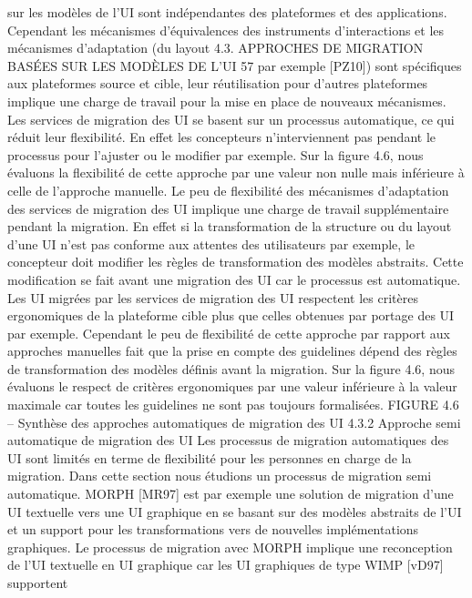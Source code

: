 \documentclass{article}
\begin{document}
sur les mod\`{e}les de l’UI sont ind\'{e}pendantes des plateformes et des applications. Cependant les m\'{e}canismes d’\'{e}quivalences des instruments d’interactions et les m\'{e}canismes d’adaptation (du layout
4.3. APPROCHES DE MIGRATION BASÉES SUR LES MODÈLES DE L’UI
57
par exemple [PZ10]) sont sp\'{e}ciﬁques aux plateformes source et cible, leur r\'{e}utilisation pour d’autres
plateformes implique une charge de travail pour la mise en place de nouveaux m\'{e}canismes.
Les services de migration des UI se basent sur un processus automatique, ce qui r\'{e}duit leur ﬂexibilit\'{e}. En effet les concepteurs n’interviennent pas pendant le processus pour l’ajuster ou le modiﬁer
par exemple. Sur la ﬁgure 4.6, nous \'{e}valuons la ﬂexibilit\'{e} de cette approche par une valeur non nulle
mais inf\'{e}rieure \`{a} celle de l’approche manuelle. Le peu de ﬂexibilit\'{e} des m\'{e}canismes d’adaptation des
services de migration des UI implique une charge de travail suppl\'{e}mentaire pendant la migration. En
effet si la transformation de la structure ou du layout d’une UI n’est pas conforme aux attentes des utilisateurs par exemple, le concepteur doit modiﬁer les r\`{e}gles de transformation des mod\`{e}les abstraits.
Cette modiﬁcation se fait avant une migration des UI car le processus est automatique.
Les UI migr\'{e}es par les services de migration des UI respectent les crit\`{e}res ergonomiques de la
plateforme cible plus que celles obtenues par portage des UI par exemple. Cependant le peu de ﬂexibilit\'{e} de cette approche par rapport aux approches manuelles fait que la prise en compte des guidelines
d\'{e}pend des r\`{e}gles de transformation des mod\`{e}les d\'{e}ﬁnis avant la migration. Sur la ﬁgure 4.6, nous
\'{e}valuons le respect de crit\`{e}res ergonomiques par une valeur inf\'{e}rieure \`{a} la valeur maximale car toutes
les guidelines ne sont pas toujours formalis\'{e}es.
FIGURE 4.6 – Synth\`{e}se des approches automatiques de migration des UI
4.3.2
Approche semi automatique de migration des UI
Les processus de migration automatiques des UI sont limit\'{e}s en terme de ﬂexibilit\'{e} pour les personnes en charge de la migration. Dans cette section nous \'{e}tudions un processus de migration semi
automatique. MORPH [MR97] est par exemple une solution de migration d’une UI textuelle vers une
UI graphique en se basant sur des mod\`{e}les abstraits de l’UI et un support pour les transformations vers
de nouvelles impl\'{e}mentations graphiques. Le processus de migration avec MORPH implique une reconception de l’UI textuelle en UI graphique car les UI graphiques de type WIMP [vD97] supportent
\end{document}
